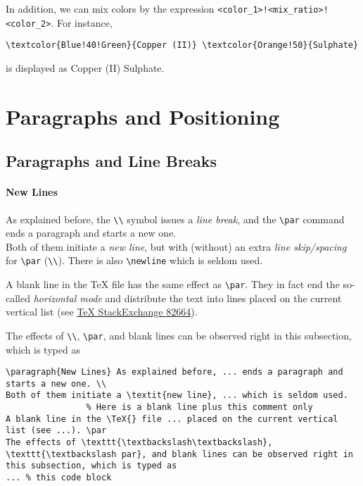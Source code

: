 In addition, we can mix colors by the expression \texttt{<color\_1>!<mix\_ratio>!\allowbreak <color\_2>}. For instance,
\begin{lstlisting}
\textcolor{Blue!40!Green}{Copper (II)} \textcolor{Orange!50}{Sulphate}
\end{lstlisting}
is displayed as \textcolor{Blue!40!Green}{Copper (II)} \textcolor{Orange!50}{Sulphate}.

\section{Paragraphs and Positioning}

\subsection{Paragraphs and Line Breaks}

\paragraph{New Lines}
As explained before, the \texttt{\textbackslash\textbackslash} symbol issues a \textit{line break}, and the \texttt{\textbackslash par} command ends a paragraph and starts a new one. \\
Both of them initiate a \textit{new line}, but with (without) an extra \textit{line skip/spacing} for \texttt{\textbackslash par} (\texttt{\textbackslash\textbackslash}). There is also \texttt{\textbackslash newline} which is seldom used.
    
A blank line in the \TeX{} file has the same effect as \texttt{\textbackslash par}. They in fact end the so-called \textit{horizontal mode} and distribute the text into lines placed on the current vertical list (see \href{https://tex.stackexchange.com/questions/82664/when-to-use-par-and-when-newline-or-blank-lines}{\TeX{} StackExchange 82664}). \par 
The effects of \texttt{\textbackslash\textbackslash}, \texttt{\textbackslash par}, and blank lines can be observed right in this subsection, which is typed as
\begin{lstlisting}
\paragraph{New Lines} As explained before, ... ends a paragraph and starts a new one. \\
Both of them initiate a \textit{new line}, ... which is seldom used.
                % Here is a blank line plus this comment only
A blank line in the \TeX{} file ... placed on the current vertical list (see ...). \par
The effects of \texttt{\textbackslash\textbackslash}, \texttt{\textbackslash par}, and blank lines can be observed right in this subsection, which is typed as
... % this code block
\end{lstlisting}

